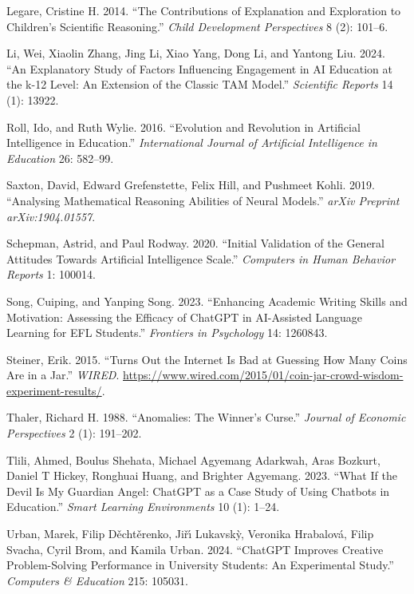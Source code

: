 \documentclass[
  11pt,
]{article}
\newlength{\cslhangindent}
\newenvironment{CSLReferences}[2] %
 {\begin{list}{}{%
  \setlength{\itemindent}{0pt}
  \setlength{\leftmargin}{0pt}
  \setlength{\parsep}{0pt}
  \ifodd #1
   \setlength{\leftmargin}{\cslhangindent}
   \setlength{\itemindent}{-1\cslhangindent}
  \fi
  \setlength{\itemsep}{#2\baselineskip}}}
 {\end{list}}
\begin{document}
\begin{CSLReferences}{1}{0}
Legare, Cristine H. 2014. {``The Contributions of Explanation and Exploration to Children's Scientific Reasoning.''} \emph{Child Development Perspectives} 8 (2): 101--6.

Li, Wei, Xiaolin Zhang, Jing Li, Xiao Yang, Dong Li, and Yantong Liu. 2024. {``An Explanatory Study of Factors Influencing Engagement in AI Education at the k-12 Level: An Extension of the Classic TAM Model.''} \emph{Scientific Reports} 14 (1): 13922.

Roll, Ido, and Ruth Wylie. 2016. {``Evolution and Revolution in Artificial Intelligence in Education.''} \emph{International Journal of Artificial Intelligence in Education} 26: 582--99.

Saxton, David, Edward Grefenstette, Felix Hill, and Pushmeet Kohli. 2019. {``Analysing Mathematical Reasoning Abilities of Neural Models.''} \emph{arXiv Preprint arXiv:1904.01557}.

Schepman, Astrid, and Paul Rodway. 2020. {``Initial Validation of the General Attitudes Towards Artificial Intelligence Scale.''} \emph{Computers in Human Behavior Reports} 1: 100014.

Song, Cuiping, and Yanping Song. 2023. {``Enhancing Academic Writing Skills and Motivation: Assessing the Efficacy of ChatGPT in AI-Assisted Language Learning for EFL Students.''} \emph{Frontiers in Psychology} 14: 1260843.

Steiner, Erik. 2015. {``Turns Out the Internet Is Bad at Guessing How Many Coins Are in a Jar.''} \emph{WIRED}. \url{https://www.wired.com/2015/01/coin-jar-crowd-wisdom-experiment-results/}.

Thaler, Richard H. 1988. {``Anomalies: The Winner's Curse.''} \emph{Journal of Economic Perspectives} 2 (1): 191--202.

Tlili, Ahmed, Boulus Shehata, Michael Agyemang Adarkwah, Aras Bozkurt, Daniel T Hickey, Ronghuai Huang, and Brighter Agyemang. 2023. {``What If the Devil Is My Guardian Angel: ChatGPT as a Case Study of Using Chatbots in Education.''} \emph{Smart Learning Environments} 10 (1): 1--24.

Urban, Marek, Filip Děchtěrenko, Jiřı́ Lukavskỳ, Veronika Hrabalová, Filip Svacha, Cyril Brom, and Kamila Urban. 2024. {``ChatGPT Improves Creative Problem-Solving Performance in University Students: An Experimental Study.''} \emph{Computers \& Education} 215: 105031.


\end{CSLReferences}
\end{document}
